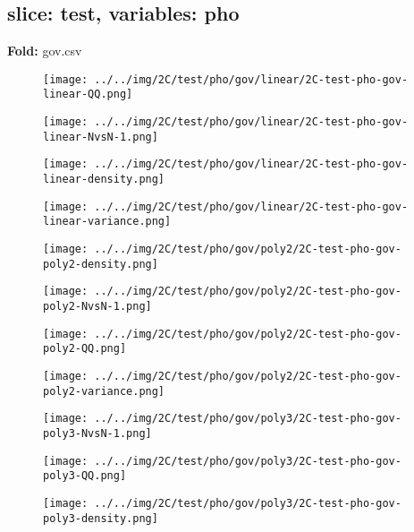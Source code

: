\subsection{slice: test, variables: pho}
\textbf{Fold:} gov.csv
\begin{figure}[H]
\centering	\texttt{[image: ../../img/2C/test/pho/gov/linear/2C-test-pho-gov-linear-QQ.png]}
\end{figure}
\begin{figure}[H]
\centering	\texttt{[image: ../../img/2C/test/pho/gov/linear/2C-test-pho-gov-linear-NvsN-1.png]}
\end{figure}
\begin{figure}[H]
\centering	\texttt{[image: ../../img/2C/test/pho/gov/linear/2C-test-pho-gov-linear-density.png]}
\end{figure}
\begin{figure}[H]
\centering	\texttt{[image: ../../img/2C/test/pho/gov/linear/2C-test-pho-gov-linear-variance.png]}
\end{figure}
\begin{figure}[H]
\centering	\texttt{[image: ../../img/2C/test/pho/gov/poly2/2C-test-pho-gov-poly2-density.png]}
\end{figure}
\begin{figure}[H]
\centering	\texttt{[image: ../../img/2C/test/pho/gov/poly2/2C-test-pho-gov-poly2-NvsN-1.png]}
\end{figure}
\begin{figure}[H]
\centering	\texttt{[image: ../../img/2C/test/pho/gov/poly2/2C-test-pho-gov-poly2-QQ.png]}
\end{figure}
\begin{figure}[H]
\centering	\texttt{[image: ../../img/2C/test/pho/gov/poly2/2C-test-pho-gov-poly2-variance.png]}
\end{figure}
\begin{figure}[H]
\centering	\texttt{[image: ../../img/2C/test/pho/gov/poly3/2C-test-pho-gov-poly3-NvsN-1.png]}
\end{figure}
\begin{figure}[H]
\centering	\texttt{[image: ../../img/2C/test/pho/gov/poly3/2C-test-pho-gov-poly3-QQ.png]}
\end{figure}
\begin{figure}[H]
\centering	\texttt{[image: ../../img/2C/test/pho/gov/poly3/2C-test-pho-gov-poly3-density.png]}
\end{figure}
